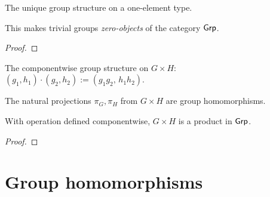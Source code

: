 \begin{definition}
  \label{def:groups:trivial-group}
  \leanok
  The unique group structure on a one-element type.
\end{definition}

\begin{proposition}
  \label{prop:groups:trivial-zero-object}
  This makes trivial groups \emph{zero-objects} of the category
  $\mathsf{Grp}$.
\end{proposition}
\begin{proof}
\end{proof}

\begin{definition}
  \label{def:groups:prod-group}
  \leanok
  The componentwise group structure on $G \times H$:
  $(g_1,h_1) \cdot (g_2,h_2) := (g_1g_2,\, h_1h_2)$.
\end{definition}

\begin{lemma}
  \label{lem:groups:prod-projections-hom}
  The natural projections $\pi_G, \pi_H$ from $G \times H$ are group
  homomorphisms.
\end{lemma}

\begin{proposition}
  \label{prop:groups:direct-product-universal}
  With operation defined componentwise, $G \times H$ is a product in
  $\mathsf{Grp}$.
\end{proposition}
\begin{proof}
\end{proof}

\section{Group homomorphisms}
\label{sec:groups:group-homomorphisms}

